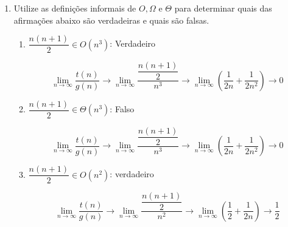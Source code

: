 \documentclass[12pt,a4paper]{article}
\begin{document}
\begin{enumerate}
\begin{enumerate}
		\begin{displaymath}
			$$\[\lim_{n \rightarrow \infty} \dfrac{t(n)}{g(n)} \rightarrow
			\lim_{n \rightarrow \infty} \dfrac{n!}{2^n} \rightarrow
			\text{Stirling’s formula} \rightarrow \lim_{n \rightarrow \infty} \dfrac{\sqrt{2\pi n}\left(\dfrac{n}{e}\right)^n}{2^n}  \rightarrow \lim_{n \rightarrow \infty} \dfrac{\sqrt{2\pi n}\dfrac{n^n}{e^n}}{2^n} \rightarrow\]\[\lim_{n \rightarrow \infty} \sqrt{2\pi n}\dfrac{n^n}{e^n2^n}  \rightarrow \lim_{n \rightarrow \infty} \sqrt{2\pi n}\left(\dfrac{n}{2e}\right)^n \rightarrow \infty\]$$
		\end{displaymath}
	
	 	Logo,  $n! \in \Omega(\sqrt{n})$
		
		
	\end{enumerate}

	\item Utilize as definições informais de $O, \Omega$ e $\Theta$ para determinar quais das afirmações abaixo são	verdadeiras e quais são falsas.
	
	\begin{enumerate}
		\item $\dfrac{n(n+1)}{2} \in O(n^3)$: Verdadeiro
		
		\begin{displaymath}
			\lim_{n \rightarrow \infty} \dfrac{t(n)}{g(n)} \rightarrow
			\lim_{n \rightarrow \infty} \dfrac{\dfrac{n(n+1)}{2}}{n^3} \rightarrow \lim_{n \rightarrow \infty} \left(\dfrac{1}{2n} + \dfrac{1}{2n^2}\right) \rightarrow 0
		\end{displaymath}
		
		\item $\dfrac{n(n+1)}{2} \in \Theta(n^3)$: Falso
		
		\begin{displaymath}
			\lim_{n \rightarrow \infty} \dfrac{t(n)}{g(n)} \rightarrow
			\lim_{n \rightarrow \infty} \dfrac{\dfrac{n(n+1)}{2}}{n^3} \rightarrow \lim_{n \rightarrow \infty} \left(\dfrac{1}{2n} + \dfrac{1}{2n^2}\right) \rightarrow 0
		\end{displaymath}
		
		\item $\dfrac{n(n+1)}{2} \in O(n^2)$: verdadeiro
		
		\begin{displaymath}
			\lim_{n \rightarrow \infty} \dfrac{t(n)}{g(n)} \rightarrow
			\lim_{n \rightarrow \infty} \dfrac{\dfrac{n(n+1)}{2}}{n^2} \rightarrow \lim_{n \rightarrow \infty} \left(\dfrac{1}{2} + \dfrac{1}{2n}\right) \rightarrow \dfrac{1}{2}
		\end{displaymath}
		

\end{enumerate}
\end{enumerate}
\end{document}
